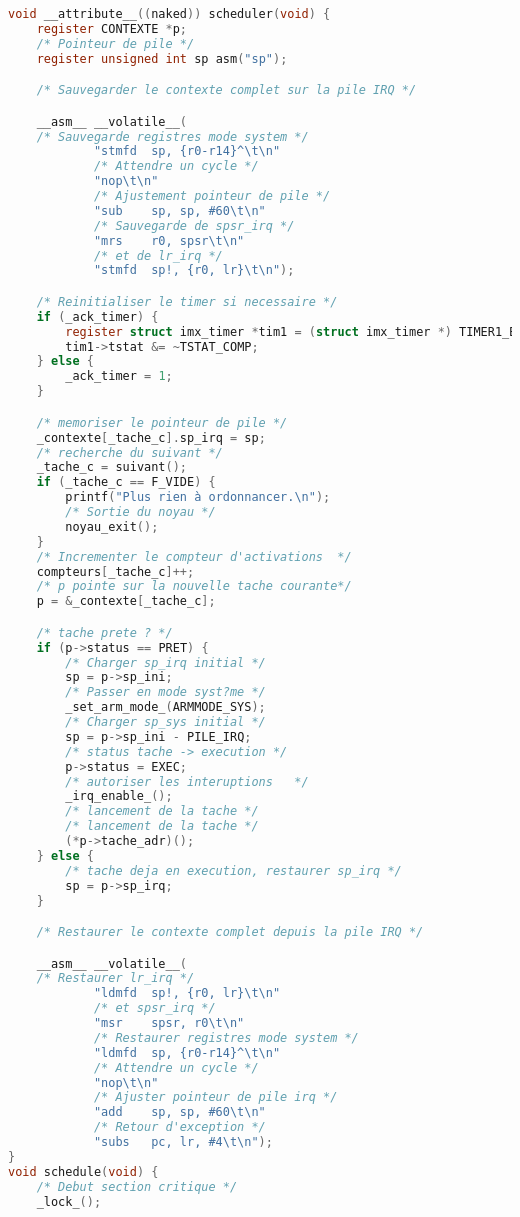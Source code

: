 \documentclass{article}
\begin{document}
\begin{lstlisting}[language=C, caption=noyau.c]
void __attribute__((naked)) scheduler(void) {
    register CONTEXTE *p;
    /* Pointeur de pile */
    register unsigned int sp asm("sp");

    /* Sauvegarder le contexte complet sur la pile IRQ */

    __asm__ __volatile__(
    /* Sauvegarde registres mode system */
            "stmfd  sp, {r0-r14}^\t\n"
            /* Attendre un cycle */
            "nop\t\n"
            /* Ajustement pointeur de pile */
            "sub    sp, sp, #60\t\n"
            /* Sauvegarde de spsr_irq */
            "mrs    r0, spsr\t\n"
            /* et de lr_irq */
            "stmfd  sp!, {r0, lr}\t\n");

    /* Reinitialiser le timer si necessaire */
    if (_ack_timer) {
        register struct imx_timer *tim1 = (struct imx_timer *) TIMER1_BASE;
        tim1->tstat &= ~TSTAT_COMP;
    } else {
        _ack_timer = 1;
    }

    /* memoriser le pointeur de pile */
    _contexte[_tache_c].sp_irq = sp;
    /* recherche du suivant */
    _tache_c = suivant();
    if (_tache_c == F_VIDE) {
        printf("Plus rien à ordonnancer.\n");
        /* Sortie du noyau */
        noyau_exit();
    }
    /* Incrementer le compteur d'activations  */
    compteurs[_tache_c]++;
    /* p pointe sur la nouvelle tache courante*/
    p = &_contexte[_tache_c];

    /* tache prete ? */
    if (p->status == PRET) {
        /* Charger sp_irq initial */
        sp = p->sp_ini;
        /* Passer en mode syst?me */
        _set_arm_mode_(ARMMODE_SYS);
        /* Charger sp_sys initial */
        sp = p->sp_ini - PILE_IRQ;
        /* status tache -> execution */
        p->status = EXEC;
        /* autoriser les interuptions   */
        _irq_enable_();
        /* lancement de la tache */
        /* lancement de la tache */
        (*p->tache_adr)();
    } else {
        /* tache deja en execution, restaurer sp_irq */
        sp = p->sp_irq;
    }

    /* Restaurer le contexte complet depuis la pile IRQ */

    __asm__ __volatile__(
    /* Restaurer lr_irq */
            "ldmfd  sp!, {r0, lr}\t\n"
            /* et spsr_irq */
            "msr    spsr, r0\t\n"
            /* Restaurer registres mode system */
            "ldmfd  sp, {r0-r14}^\t\n"
            /* Attendre un cycle */
            "nop\t\n"
            /* Ajuster pointeur de pile irq */
            "add    sp, sp, #60\t\n"
            /* Retour d'exception */
            "subs   pc, lr, #4\t\n");
}
void schedule(void) {
    /* Debut section critique */
    _lock_();


\end{lstlisting}
\end{document}
